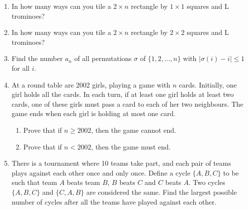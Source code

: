 \documentclass[12pt]{scrartcl}
\begin{document}
\begin{enumerate}[resume]
    \item In how many ways can you tile a $2\times n$ rectangle by $1\times1$ squares and L trominoes?

    \item In how many ways can you tile a $2\times n$ rectangle by $2\times2$ squares and L trominoes?

    \item Find the number $a_{n}$ of all permutations $\sigma$ of $\{1,2,...,n\}$ with $|\sigma(i)-i|\le1$ for all $i$.

    \item At a round table are 2002 girls, playing a game with $n$ cards. Initially, one girl holds all the cards. In each turn, if at least one girl holds at least two cards, one of these girls must pass a card to each of her two neighbours. The game ends when each girl is holding at most one card.
    \begin{enumerate}
        \item[(a)] Prove that if $n\ge2002$, then the game cannot end.
        \item[(b)] Prove that if $n<2002$, then the game must end.
    \end{enumerate}

    \item There is a tournament where 10 teams take part, and each pair of teams plays against each other once and only once. Define a cycle $\{A, B, C\}$ to be such that team $A$ beats team $B$, $B$ beats $C$ and $C$ beats $A$. Two cycles $\{A, B, C\}$ and $\{C, A, B\}$ are considered the same. Find the largest possible number of cycles after all the teams have played against each other.
\end{enumerate}
\end{document}
